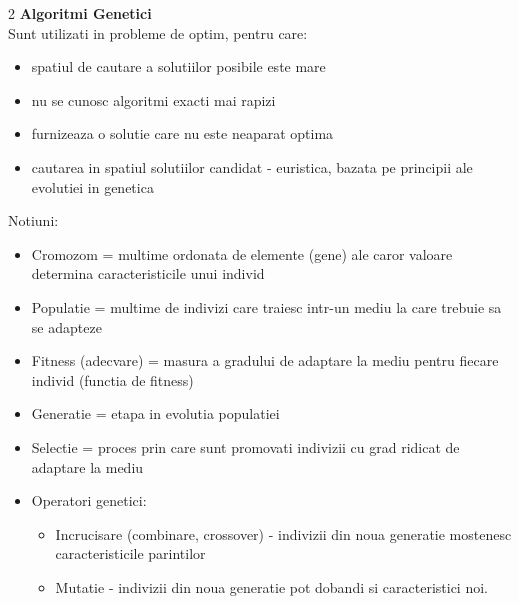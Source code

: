 \documentclass[a4paper]{article}
\begin{document}
\begin{multicols}{2}
\textbf{Algoritmi Genetici}\\
Sunt utilizati in probleme de optim, pentru care:
\begin{itemize}
    \item spatiul de cautare a solutiilor posibile este mare
    \item nu se cunosc algoritmi exacti mai rapizi
    \item furnizeaza o solutie care nu este neaparat optima
    \item cautarea in spatiul solutiilor candidat - euristica, bazata pe principii ale evolutiei in genetica
\end{itemize}

Notiuni:
\begin{itemize}
    \item Cromozom = multime ordonata de elemente (gene) ale caror valoare determina caracteristicile unui individ
    \item Populatie = multime de indivizi care traiesc intr-un mediu la care trebuie sa se adapteze
    \item Fitness (adecvare) = masura a gradului de adaptare la mediu pentru fiecare individ (functia de fitness)
    \item Generatie = etapa in evolutia populatiei
    \item Selectie = proces prin care sunt promovati indivizii cu grad ridicat de adaptare la mediu
    \item Operatori genetici:
    \begin{itemize}
        \item Incrucisare (combinare, crossover) - indivizii din noua generatie mostenesc caracteristicile parintilor
        \item Mutatie - indivizii din noua generatie pot dobandi si caracteristici noi.
    \end{itemize}
\end{itemize}


\end{multicols}
\end{document}
